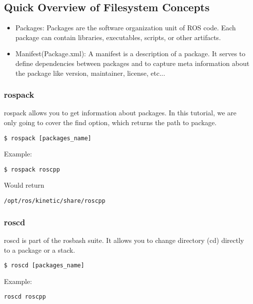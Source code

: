 \subsection{Quick Overview of Filesystem Concepts}

\begin{itemize}
	\item Packages: Packages are the software organization unit of ROS code. Each package can contain libraries, executables, scripts, or other artifacts.
	\item Manifest(Package.xml): A manifest is a description of a package. It serves to define dependencies between packages and to capture meta information about the package like version, maintainer, license, etc...
\end{itemize}

\subsubsection{rospack}

rospack allows you to get information about packages. In this tutorial, we are only going to cover the find option, which returns the path to package. 

\begin{lstlisting}[breaklines=True language=bash]
$ rospack [packages_name]
\end{lstlisting}

Example:
\begin{lstlisting}[breaklines=True language=bash]
$ rospack roscpp
\end{lstlisting}

Would return
\begin{lstlisting}[breaklines=True language=bash]
	/opt/ros/kinetic/share/roscpp
\end{lstlisting}

\subsubsection{roscd}
roscd is part of the rosbash suite. It allows you to change directory (cd) directly to a package or a stack.

\begin{lstlisting}[breaklines=True language=bash]
$ roscd [packages_name]
\end{lstlisting}

Example:
\begin{lstlisting}[breaklines=True language=bash]
roscd roscpp
\end{lstlisting}

